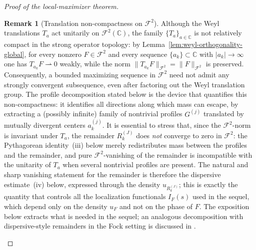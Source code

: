 \documentclass[a4paper,11pt,reqno]{amsart}
\numberwithin{equation}{section}
\theoremstyle{plain} %
\theoremstyle{definition} %
\newtheorem{remark}{Remark}[section]
\theoremstyle{remark}
\newcommand{\C}{\mathbb{C}}
\begin{document}
\begin{proof}[Proof of the local-maximizer theorem]
\begin{remark}[Translation non-compactness on \(\mathcal F^2\)]\label{rmk:translation-noncompact}
Although the Weyl translations \(T_a\) act unitarily on \(\mathcal F^2(\C)\),
the family \(\{T_a\}_{a\in\C}\) is not relatively compact in the strong
operator topology: by Lemma~\ref{lem:weyl-orthogonality-global}, for every
nonzero \(F\in \mathcal F^2\) and every sequence \(\{a_k\}\subset \C\) with
\(|a_k|\to\infty\) one has \(T_{a_k}F\rightharpoonup 0\) weakly, while the
norm \(\|T_{a_k}F\|_{\mathcal F^2}=\|F\|_{\mathcal F^2}\) is preserved.
Consequently, a bounded maximizing sequence in \(\mathcal F^2\) need not
admit any strongly convergent subsequence, even after factoring out the
Weyl translation group. The profile decomposition stated below is the
device that quantifies this non-compactness: it identifies all directions
along which mass can escape, by extracting a (possibly infinite) family of
nontrivial profiles \(G^{(j)}\) translated by mutually divergent centers
\(a_k^{(j)}\). It is essential to stress that, since the
\(\mathcal F^2\)-norm is invariant under \(T_a\), the remainder
\(R_k^{(J)}\) does \emph{not} converge to zero in \(\mathcal F^2\): the
Pythagorean identity~(iii) below merely redistributes mass between the
profiles and the remainder, and pure \(\mathcal F^2\)-vanishing of the
remainder is incompatible with the unitarity of \(T_a\) when several
nontrivial profiles are present. The natural and sharp vanishing statement
for the remainder is therefore the dispersive estimate~(iv) below,
expressed through the density \(u_{R_k^{(J)}}\); this is exactly the
quantity that controls all the localization functionals \(I_F(s)\) used in
the sequel, which depend only on the density \(u_F\) and not on the phase
of \(F\). The exposition below extracts what is needed in the sequel; an
analogous decomposition with dispersive-style remainders in the Fock
setting is discussed in
\cite{Nicola-Romero-Trapasso,Marceca-Romero-Speckbacher,Fulsche-Hagger,Samuelsen}.
\end{remark}


\end{proof}
\end{document}

